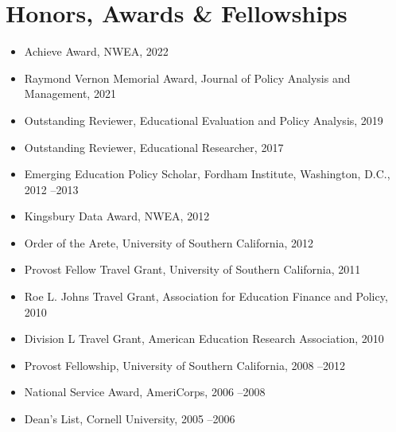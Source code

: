 \documentclass[11pt, letterpaper]{article}
\begin{document}
\section{Honors, Awards \& Fellowships}
\begin{itemize}
  \item Achieve Award, NWEA, 2022%

  \item Raymond Vernon Memorial Award, Journal of Policy Analysis and Management, 2021%

  \item Outstanding Reviewer, Educational Evaluation and Policy Analysis, 2019%

  \item Outstanding Reviewer, Educational Researcher, 2017%

  \item Emerging Education Policy Scholar, Fordham Institute, Washington, D.C., 2012%
--2013
  \item Kingsbury Data Award, NWEA, 2012%

  \item Order of the Arete, University of Southern California, 2012%

  \item Provost Fellow Travel Grant, University of Southern California, 2011%

  \item Roe L. Johns Travel Grant, Association for Education Finance and Policy, 2010%

  \item Division L Travel Grant, American Education Research Association, 2010%

  \item Provost Fellowship, University of Southern California, 2008%
--2012
  \item National Service Award, AmeriCorps, 2006%
--2008
  \item Dean's List, Cornell University, 2005%
--2006
\end{itemize}

\end{document}
